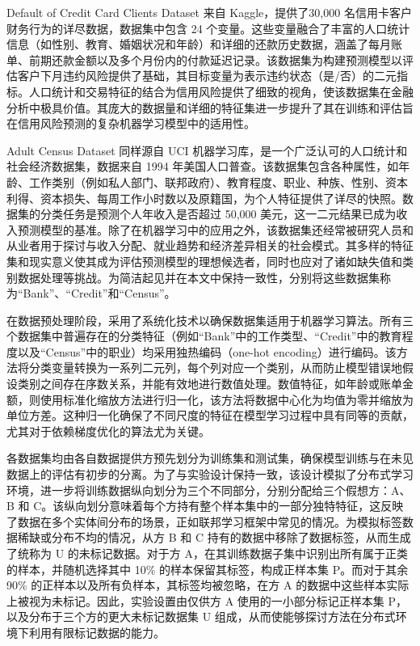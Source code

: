 Default of Credit Card Clients Dataset 来自 Kaggle，提供了30,000 名信用卡客户财务行为的详尽数据，数据集中包含 24 个变量。这些变量融合了丰富的人口统计信息（如性别、教育、婚姻状况和年龄）和详细的还款历史数据，涵盖了每月账单、前期还款金额以及多个月份内的付款延迟记录。该数据集为构建预测模型以评估客户下月违约风险提供了基础，其目标变量为表示违约状态（是/否）的二元指标。人口统计和交易特征的结合为信用风险提供了细致的视角，使该数据集在金融分析中极具价值。其庞大的数据量和详细的特征集进一步提升了其在训练和评估旨在信用风险预测的复杂机器学习模型中的适用性。

Adult Census Dataset 同样源自 UCI 机器学习库，是一个广泛认可的人口统计和社会经济数据集，数据来自 1994 年美国人口普查。该数据集包含各种属性，如年龄、工作类别（例如私人部门、联邦政府）、教育程度、职业、种族、性别、资本利得、资本损失、每周工作小时数以及原籍国，为个人特征提供了详尽的快照。数据集的分类任务是预测个人年收入是否超过 50,000 美元，这一二元结果已成为收入预测模型的基准。除了在机器学习中的应用之外，该数据集还经常被研究人员和从业者用于探讨与收入分配、就业趋势和经济差异相关的社会模式。其多样的特征集和现实意义使其成为评估预测模型的理想候选者，同时也应对了诸如缺失值和类别数据处理等挑战。为简洁起见并在本文中保持一致性，分别将这些数据集称为“Bank”、“Credit”和“Census”。

在数据预处理阶段，采用了系统化技术以确保数据集适用于机器学习算法。所有三个数据集中普遍存在的分类特征（例如“Bank”中的工作类型、“Credit”中的教育程度以及“Census”中的职业）均采用独热编码（one-hot encoding）进行编码。该方法将分类变量转换为一系列二元列，每个列对应一个类别，从而防止模型错误地假设类别之间存在序数关系，并能有效地进行数值处理。数值特征，如年龄或账单金额，则使用标准化缩放方法进行归一化，该方法将数据中心化为均值为零并缩放为单位方差。这种归一化确保了不同尺度的特征在模型学习过程中具有同等的贡献，尤其对于依赖梯度优化的算法尤为关键。

各数据集均由各自数据提供方预先划分为训练集和测试集，确保模型训练与在未见数据上的评估有初步的分离。为了与实验设计保持一致，该设计模拟了分布式学习环境，进一步将训练数据纵向划分为三个不同部分，分别分配给三个假想方：A、B 和 C。该纵向划分意味着每个方持有整个样本集中的一部分独特特征，这反映了数据在多个实体间分布的场景，正如联邦学习框架中常见的情况。为模拟标签数据稀缺或分布不均的情况，从方 B 和 C 持有的数据中移除了数据标签，从而生成了统称为 U 的未标记数据。对于方 A，在其训练数据子集中识别出所有属于正类的样本，并随机选择其中 10\% 的样本保留其标签，构成正样本集 P。而对于其余 90\% 的正样本以及所有负样本，其标签均被忽略，在方 A 的数据中这些样本实际上被视为未标记。因此，实验设置由仅供方 A 使用的一小部分标记正样本集 P，以及分布于三个方的更大未标记数据集 U 组成，从而使能够探讨方法在分布式环境下利用有限标记数据的能力。

